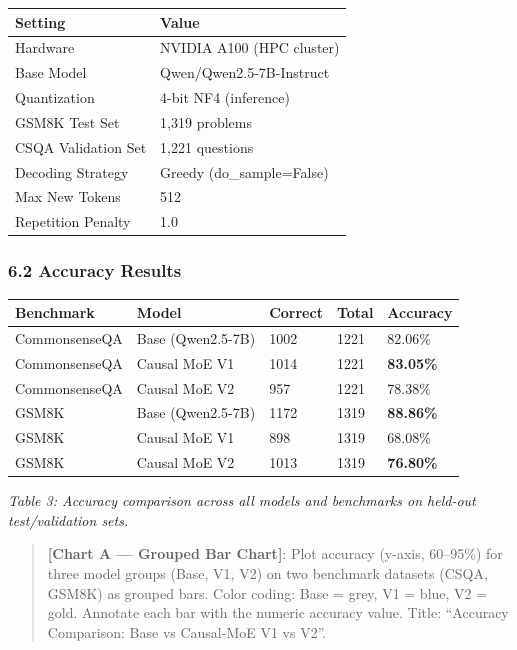 {\def\LTcaptype{none} %
\begin{longtable}[]{@{}ll@{}}
\toprule\noalign{}
Setting & Value \\
\midrule\noalign{}
\endhead
\bottomrule\noalign{}
\endlastfoot
Hardware & NVIDIA A100 (HPC cluster) \\
Base Model & Qwen/Qwen2.5-7B-Instruct \\
Quantization & 4-bit NF4 (inference) \\
GSM8K Test Set & 1,319 problems \\
CSQA Validation Set & 1,221 questions \\
Decoding Strategy & Greedy (do\_sample=False) \\
Max New Tokens & 512 \\
Repetition Penalty & 1.0 \\
\end{longtable}
}

\subsubsection{6.2 Accuracy Results}\label{accuracy-results}

{\def\LTcaptype{none} %
\begin{longtable}[]{@{}lllll@{}}
\toprule\noalign{}
Benchmark & Model & Correct & Total & Accuracy \\
\midrule\noalign{}
\endhead
\bottomrule\noalign{}
\endlastfoot
CommonsenseQA & Base (Qwen2.5-7B) & 1002 & 1221 & 82.06\% \\
CommonsenseQA & Causal MoE V1 & 1014 & 1221 & \textbf{83.05\%} \\
CommonsenseQA & Causal MoE V2 & 957 & 1221 & 78.38\% \\
GSM8K & Base (Qwen2.5-7B) & 1172 & 1319 & \textbf{88.86\%} \\
GSM8K & Causal MoE V1 & 898 & 1319 & 68.08\% \\
GSM8K & Causal MoE V2 & 1013 & 1319 & \textbf{76.80\%} \\
\end{longtable}
}

\emph{Table 3: Accuracy comparison across all models and benchmarks on
held-out test/validation sets.}

\begin{quote}
\textbf{{[}Chart A --- Grouped Bar Chart{]}}: Plot accuracy (y-axis,
60--95\%) for three model groups (Base, V1, V2) on two benchmark
datasets (CSQA, GSM8K) as grouped bars. Color coding: Base = grey, V1 =
blue, V2 = gold. Annotate each bar with the numeric accuracy value.
Title: ``Accuracy Comparison: Base vs Causal-MoE V1 vs V2''.
\end{quote}

